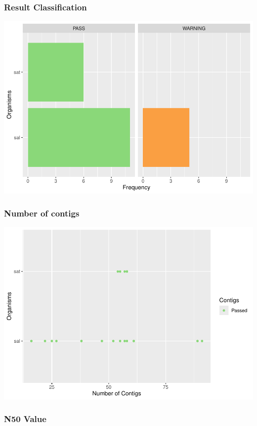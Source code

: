 \documentclass[
  a4paper,
]{article}
\begin{document}
\subsubsection{Result Classification}\label{result-classification}

\includegraphics{qualifyr_report_2027-07-28_files/figure-latex/organism results-1.pdf}

\subsubsection{Number of contigs}\label{number-of-contigs}

\includegraphics{qualifyr_report_2027-07-28_files/figure-latex/unnamed-chunk-1-1.pdf}

\subsubsection{N50 Value}\label{n50-value}
\end{document}
